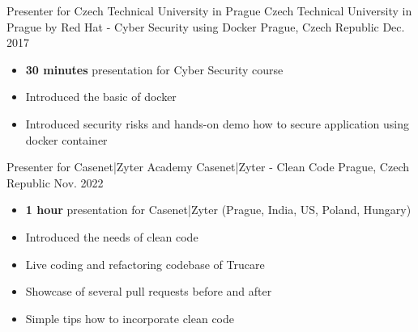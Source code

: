 

\begin{cventries}

  \cventry
    {Presenter for Czech Technical University in Prague} %
    {Czech Technical University in Prague by Red Hat - Cyber Security using Docker} %
    {Prague, Czech Republic} %
    {Dec. 2017} %
    {
      \begin{itemize} %
        \vspace{-11pt} \item {\textbf{30 minutes} presentation for Cyber Security course}
        \item {Introduced the basic of docker}
        \item {Introduced security risks and hands-on demo how to secure application using docker container}
      \end{itemize}
    }

  \cventry
    {Presenter for Casenet|Zyter Academy} %
    { Casenet|Zyter - Clean Code} %
    {Prague, Czech Republic} %
    {Nov. 2022} %
    {
        \begin{itemize}
            \vspace{-11pt} \item {\textbf{1 hour} presentation for Casenet|Zyter (Prague, India, US, Poland, Hungary)}
            \item {Introduced the needs of clean code}
            \item {Live coding and refactoring codebase of Trucare}
            \item {Showcase of several pull requests before and after}
            \item {Simple tips how to incorporate clean code}
        \end{itemize}
    }


\end{cventries}
